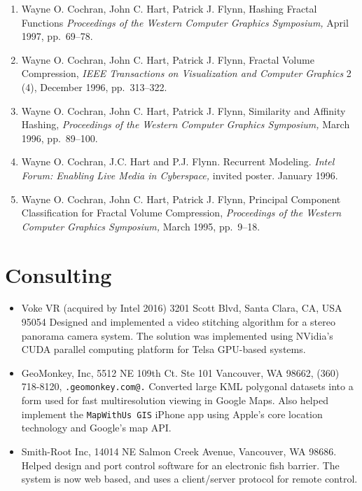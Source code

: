 \documentclass[10pt]{article}
\begin{document}
\begin{enumerate}
\item
Wayne O. Cochran, John C. Hart, Patrick J. Flynn,
Hashing Fractal Functions
{\em Proceedings of the Western Computer Graphics Symposium,}
April 1997, pp.~69--78.

\item
Wayne O. Cochran, John C. Hart, Patrick J. Flynn,
Fractal Volume Compression,
{\em IEEE Transactions on Visualization and Computer Graphics}
2 (4),
December 1996, pp.~313--322.

\item
Wayne O. Cochran, John C. Hart, Patrick J. Flynn,
Similarity and Affinity Hashing,
{\em Proceedings of the Western Computer Graphics Symposium,}
March 1996, pp.~89--100.

\item
Wayne O. Cochran, J.C. Hart and P.J. Flynn. Recurrent Modeling. 
{\em Intel Forum: Enabling Live Media in Cyberspace,} 
invited poster. January 1996.

\item
Wayne O. Cochran, John C. Hart, Patrick J. Flynn,
Principal Component Classification for Fractal Volume Compression,
{\em Proceedings of the Western Computer Graphics Symposium,}
March 1995, \mbox{pp.~9--18}.

\end{enumerate}


\section*{Consulting}

\begin{itemize}


\item Voke VR (acquired by Intel 2016) 
3201 Scott Blvd, Santa Clara, CA, USA 95054
Designed and implemented a video stitching algorithm for
a stereo panorama camera system. The solution was
implemented using NVidia's CUDA parallel computing platform
for Telsa GPU-based systems.


\item GeoMonkey, Inc, 
5512 NE 109th Ct. Ste 101
Vancouver, WA 98662,
(360) 718-8120,
{\tt \verb@www.geomonkey.com@.}  
  Converted large KML polygonal datasets into a form used for
  fast multiresolution viewing in Google Maps.
  Also helped implement the {\tt MapWithUs GIS} iPhone app using Apple's core location technology
  and Google's map API.
\item Smith-Root Inc, 14014 NE Salmon Creek Avenue, Vancouver, WA 98686.\\
Helped design and port control software for an
electronic fish barrier. The system is now web based, and uses a 
client/server protocol for remote control.
\end{itemize}
\end{document}
